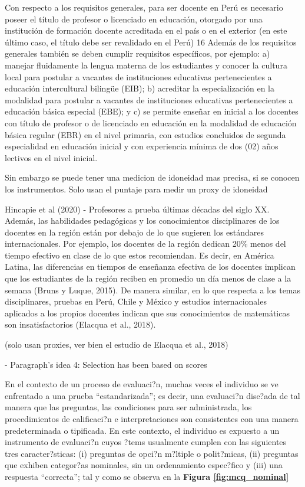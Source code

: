 Con respecto a los requisitos generales, para ser docente en Perú es necesario poseer el título de profesor o licenciado en educación, otorgado por una institución de formación docente acreditada en el país o en el exterior (en este último caso, el título debe ser revalidado en el Perú) 16 Además de los requisitos generales también se deben cumplir requisitos específicos, por ejemplo: a) manejar fluidamente la lengua materna de los estudiantes y conocer la cultura local para postular a vacantes de instituciones educativas pertenecientes a educación intercultural bilingüe (EIB); b) acreditar la especialización en la modalidad para postular a vacantes de instituciones educativas pertenecientes a educación básica especial (EBE); y c) se permite enseñar en inicial a los docentes con título de profesor o de licenciado en educación en la modalidad de educación básica regular (EBR) en el nivel primaria, con estudios concluidos de segunda especialidad en educación inicial y con experiencia mínima de dos (02) años lectivos en el nivel inicial.

Sin embargo se puede tener una medicion de idoneidad mas precisa, si se conocen los instrumentos. Solo usan el puntaje para medir un proxy de idoneidad


Hincapie et al (2020) - Profesores a prueba
últimas décadas del siglo XX. Además, las habilidades pedagógicas y los conocimientos disciplinares de los docentes en la región están por debajo de lo que sugieren los estándares internacionales. Por ejemplo, los docentes de la región dedican 20\% menos del tiempo efectivo en clase de lo que estos recomiendan. Es decir, en América Latina, las diferencias
en tiempos de enseñanza efectiva de los docentes implican que los estudiantes de la región reciben en promedio un día menos de clase a la semana (Bruns y Luque, 2015). De manera similar, en lo que respecta a los temas disciplinares, pruebas en Perú, Chile y México y estudios internacionales aplicados a los propios docentes indican que sus conocimientos de
matemáticas son insatisfactorios (Elacqua et al., 2018).

(solo usan proxies, ver bien el estudio de Elacqua et al., 2018)


- Paragraph's idea 4: Selection has been based on scores

En el contexto de un proceso de evaluaci?n, muchas veces el individuo se ve enfrentado a una prueba ``estandarizada''; es decir, una evaluaci?n dise?ada de tal manera que las preguntas, las condiciones para ser administrada, los procedimientos de calificaci?n e interpretaciones son consistentes con una manera predeterminada o tipificada. En este contexto, el individuo es expuesto a un instrumento de evaluaci?n cuyos ?tems usualmente cumplen con las siguientes tres caracter?sticas: (i) preguntas de opci?n m?ltiple o polit?micas, (ii) preguntas que exhiben categor?as nominales, sin un ordenamiento espec?fico y (iii) una respuesta ``correcta''; tal y como se observa en la \textbf{Figura \ref{fig:mcq_nominal}}


